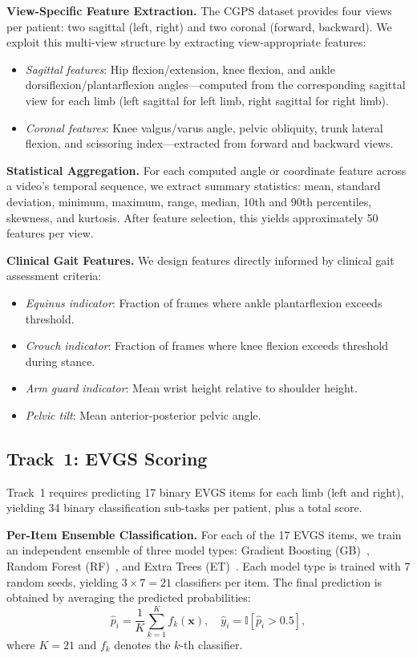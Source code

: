 \noindent\textbf{View-Specific Feature Extraction.}
The CGPS dataset provides four views per patient: two sagittal (left, right) and two coronal (forward, backward). We exploit this multi-view structure by extracting view-appropriate features:
\begin{itemize}[leftmargin=*,nosep]
    \item \textit{Sagittal features}: Hip flexion/extension, knee flexion, and ankle dorsiflexion/plantarflexion angles---computed from the corresponding sagittal view for each limb (left sagittal for left limb, right sagittal for right limb).
    \item \textit{Coronal features}: Knee valgus/varus angle, pelvic obliquity, trunk lateral flexion, and scissoring index---extracted from forward and backward views.
\end{itemize}

\noindent\textbf{Statistical Aggregation.}
For each computed angle or coordinate feature across a video's temporal sequence, we extract summary statistics: mean, standard deviation, minimum, maximum, range, median, 10th and 90th percentiles, skewness, and kurtosis. After feature selection, this yields approximately 50 features per view.

\noindent\textbf{Clinical Gait Features.}
We design features directly informed by clinical gait assessment criteria:
\begin{itemize}[leftmargin=*,nosep]
    \item \textit{Equinus indicator}: Fraction of frames where ankle plantarflexion exceeds threshold.
    \item \textit{Crouch indicator}: Fraction of frames where knee flexion exceeds threshold during stance.
    \item \textit{Arm guard indicator}: Mean wrist height relative to shoulder height.
    \item \textit{Pelvic tilt}: Mean anterior-posterior pelvic angle.
\end{itemize}

\subsection{Track~1: EVGS Scoring}
\label{sec:track1}

Track~1 requires predicting 17 binary EVGS items for each limb (left and right), yielding 34 binary classification sub-tasks per patient, plus a total score.

\noindent\textbf{Per-Item Ensemble Classification.}
For each of the 17 EVGS items, we train an independent ensemble of three model types: Gradient Boosting (GB)~\cite{friedman2001greedy}, Random Forest (RF)~\cite{breiman2001random}, and Extra Trees (ET)~\cite{geurts2006extremely}. Each model type is trained with 7 random seeds, yielding $3 \times 7 = 21$ classifiers per item. The final prediction is obtained by averaging the predicted probabilities:
\begin{equation}
    \hat{p}_i = \frac{1}{K} \sum_{k=1}^{K} f_k(\mathbf{x}), \quad \hat{y}_i = \mathbb{I}[\hat{p}_i > 0.5],
\end{equation}
where $K=21$ and $f_k$ denotes the $k$-th classifier.

